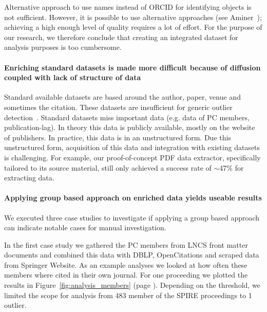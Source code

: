 \documentclass{ou-report}
\newcommand{\lncs}{LNCS}
\newcommand{\dblp}{DBLP}
\newcommand{\orcid}{ORCID}
\begin{document}
Alternative approach to use names instead of \orcid{} for identifying objects
is not sufficient. However, it is possible to use alternative approaches 
(see Aminer~\cite{Tang:08KDD}); achieving a high enough level of quality 
requires a lot of effort. For the purpose of our research, we therefore conclude
that creating an integrated dataset for analysis purposes is too cumbersome.

\paragraph{Enriching standard datasets is made more difficult because of 
diffusion coupled with lack of structure of data}
Standard available datasets are based around the author, paper, venue and 
sometimes the citation. These datasets are insufficient for generic outlier 
detection~\cite{TEJ2017}. 
Standard datasets miss important data (e.g. data of PC members, 
publication-lag). In theory this data is publicly available, mostly on 
the website of publishers. In practice, this data is in an unstructured form.
Due this unstructured form, acquisition of this data and integration with
existing datasets is challenging. For example, our proof-of-concept PDF data
extractor, specifically tailored to its source material, still only achieved
a success rate of $\sim$47\% for extracting data.

\paragraph{Applying group based approach on enriched data yields useable results}
We executed three case studies to investigate if applying a group based approach 
can indicate notable cases for manual investigation.

In the first case study we gathered the PC members from \lncs{} front matter 
documents and combined this data with \dblp{}, OpenCitations and scraped data 
from Springer Website. As an example analyses we looked at how often these 
members where cited in their own journal. For one proceeding we plotted the 
results in Figure~\ref{fig:analysis_members} (page 
\pageref{fig:analysis_members}). Depending on the threshold, we 
limited the scope for analysis from 483 member of the SPIRE proceedings to 1 
outlier.
\end{document}
